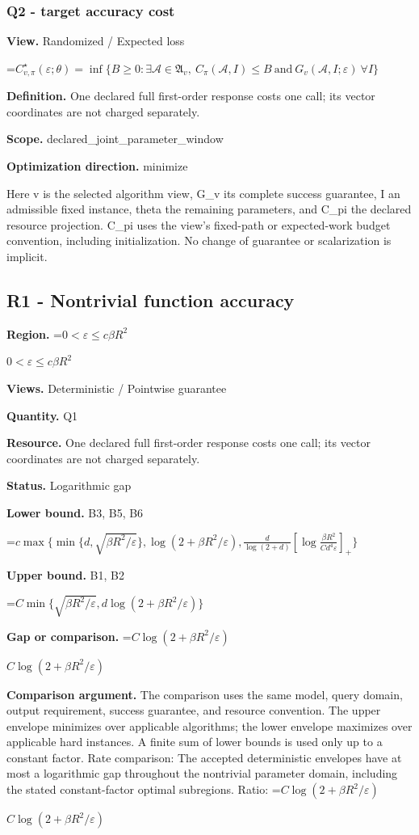\documentclass[10pt,a4paper]{article}
\newcommand{\AtlasMath}[1]{\par\begingroup\centering\setbox0=\hbox{$\displaystyle #1$}\ifdim\wd0>1.4\linewidth\typeout{ATLAS WIDE FORMULA: \the\wd0}\fi\ifdim\wd0>\linewidth\resizebox{\linewidth}{!}{\box0}\else\box0\fi\par\endgroup}
\newcommand{\AtlasInlineMath}[1]{\begingroup\setbox0=\hbox{$#1$}\ifdim\wd0>.4\linewidth\endgroup\AtlasMath{#1}\else\endgroup$#1$\fi}
\begin{document}
\subsubsection{Q2 - target accuracy cost}
\textbf{View.} Randomized / Expected loss

\AtlasMath{C^\star_{v,\pi}(\varepsilon;\theta)=\inf\{B\ge0:\exists\mathcal A\in\mathfrak A_v,\ C_\pi(\mathcal A,I)\le B\ \text{and}\ G_v(\mathcal A,I;\varepsilon)\ \forall I\}}
\textbf{Definition.} One declared full first-order response costs one call; its vector coordinates are not charged separately.

\textbf{Scope.} declared\_joint\_parameter\_window

\textbf{Optimization direction.} minimize

Here v is the selected algorithm view, G\_v its complete success guarantee, I an admissible fixed instance, theta the remaining parameters, and C\_pi the declared resource projection. C\_pi uses the view's fixed-path or expected-work budget convention, including initialization. No change of guarantee or scalarization is implicit.

\subsection{R1 - Nontrivial function accuracy}
\textbf{Region.} \AtlasInlineMath{0<\varepsilon\le c\beta R^2}

\textbf{Views.} Deterministic / Pointwise guarantee

\textbf{Quantity.} Q1

\textbf{Resource.} One declared full first-order response costs one call; its vector coordinates are not charged separately.

\textbf{Status.} Logarithmic gap

\textbf{Lower bound.} B3, B5, B6

\AtlasMath{c\max\{\min\{d,\sqrt{\beta R^2/\varepsilon}\},\log(2+\beta R^2/\varepsilon),\frac d{\log(2+d)}[\log\frac{\beta R^2}{Cd^4\varepsilon}]_+\}}
\textbf{Upper bound.} B1, B2

\AtlasMath{C\min\{\sqrt{\beta R^2/\varepsilon},d\log(2+\beta R^2/\varepsilon)\}}
\textbf{Gap or comparison.} \AtlasInlineMath{C\log(2+\beta R^2/\varepsilon)}

\textbf{Comparison argument.} The comparison uses the same model, query domain, output requirement, success guarantee, and resource convention. The upper envelope minimizes over applicable algorithms; the lower envelope maximizes over applicable hard instances. A finite sum of lower bounds is used only up to a constant factor. Rate comparison: The accepted deterministic envelopes have at most a logarithmic gap throughout the nontrivial parameter domain, including the stated constant-factor optimal subregions. Ratio: \AtlasInlineMath{C\log(2+\beta R^2/\varepsilon)}
\end{document}
